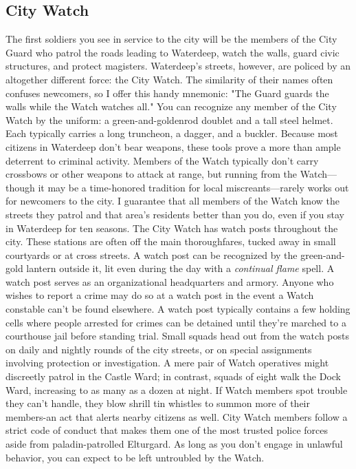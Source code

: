 \documentclass[10pt,a4paper,twoside,twocolumn,openany,nodeprecatedcode]{dndbook}
\begin{document}
\subsection{City Watch}
The first soldiers you see in service to the city will be the members of the City Guard who patrol the roads leading to Waterdeep, watch the walls, guard civic structures, and protect magisters. Waterdeep's streets, however, are policed by an altogether different force: the City Watch. The similarity of their names often confuses newcomers, so I offer this handy mnemonic: "The Guard guards the walls while the Watch watches all."
You can recognize any member of the City Watch by the uniform: a green-and-goldenrod doublet and a tall steel helmet. Each typically carries a long truncheon, a dagger, and a buckler. Because most citizens in Waterdeep don't bear weapons, these tools prove a more than ample deterrent to criminal activity. Members of the Watch typically don't carry crossbows or other weapons to attack at range, but running from the Watch—though it may be a time-honored tradition for local miscreants—rarely works out for newcomers to the city. I guarantee that all members of the Watch know the streets they patrol and that area's residents better than you do, even if you stay in Waterdeep for ten seasons.
The City Watch has watch posts throughout the city. These stations are often off the main thoroughfares, tucked away in small courtyards or at cross streets. A watch post can be recognized by the green-and-gold lantern outside it, lit even during the day with a \textit{continual flame} spell. A watch post serves as an organizational headquarters and armory. Anyone who wishes to report a crime may do so at a watch post in the event a Watch constable can't be found elsewhere. A watch post typically contains a few holding cells where people arrested for crimes can be detained until they're marched to a courthouse jail before standing trial.
Small squads head out from the watch posts on daily and nightly rounds of the city streets, or on special assignments involving protection or investigation. A mere pair of Watch operatives might discreetly patrol in the Castle Ward; in contrast, squads of eight walk the Dock Ward, increasing to as many as a dozen at night. If Watch members spot trouble they can't handle, they blow shrill tin whistles to summon more of their members-an act that alerts nearby citizens as well.
City Watch members follow a strict code of conduct that makes them one of the most trusted police forces aside from paladin-patrolled Elturgard. As long as you don't engage in unlawful behavior, you can expect to be left untroubled by the Watch.
\end{document}
